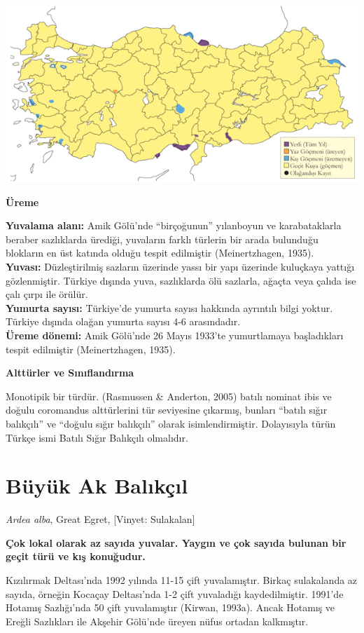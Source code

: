 \documentclass[
  a4paper,
  DIV=11,
  numbers=noendperiod]{scrreprt}
\begin{document}
\includegraphics{images/harita_Page_068.png}

\textbf{Üreme}

\textbf{Yuvalama alanı:} Amik Gölü'nde ``birçoğunun'' yılanboyun ve
karabataklarla beraber sazlıklarda ürediği, yuvaların farklı türlerin
bir arada bulunduğu blokların en üst katında olduğu tespit edilmiştir
(Meinertzhagen, 1935).\\
\textbf{Yuvası:} Düzleştirilmiş sazların üzerinde yassı bir yapı
üzerinde kuluçkaya yattığı gözlenmiştir. Türkiye dışında yuva,
sazlıklarda ölü sazlarla, ağaçta veya çalıda ise çalı çırpı ile
örülür.\\
\textbf{Yumurta sayısı:} Türkiye'de yumurta sayısı hakkında ayrıntılı
bilgi yoktur. Türkiye dışında olağan yumurta sayısı 4-6 arasındadır.\\
\textbf{Üreme dönemi:} Amik Gölü'nde 26 Mayıs 1933'te yumurtlamaya
başladıkları tespit edilmiştir (Meinertzhagen, 1935).

\textbf{Alttürler ve Sınıflandırma}

Monotipik bir türdür. (Rasmussen \& Anderton, 2005) batılı nominat ibis
ve doğulu coromandus alttürlerini tür seviyesine çıkarmış, bunları
``batılı sığır balıkçılı'' ve ``doğulu sığır balıkçılı'' olarak
isimlendirmiştir. Dolayısıyla türün Türkçe ismi Batılı Sığır Balıkçılı
olmalıdır.

\section{Büyük Ak Balıkçıl}\label{buxfcyuxfck-ak-balux131kuxe7ux131l}

\emph{Ardea alba}, Great Egret, {[}Vinyet: Sulakalan{]}

\textbf{Çok lokal olarak az sayıda yuvalar. Yaygın ve çok sayıda bulunan
bir geçit türü ve kış konuğudur.}

Kızılırmak Deltası'nda 1992 yılında 11-15 çift yuvalamıştır. Birkaç
sulakalanda az sayıda, örneğin Kocaçay Deltası'nda 1-2 çift yuvaladığı
kaydedilmiştir. 1991'de Hotamış Sazlığı'nda 50 çift yuvalamıştır
(Kirwan, 1993a). Ancak Hotamış ve Ereğli Sazlıkları ile Akşehir Gölü'nde
üreyen nüfus ortadan kalkmıştır.
\end{document}
